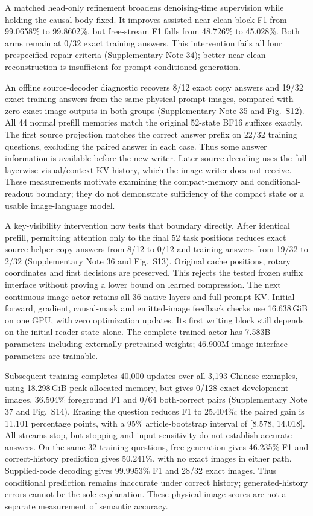A matched head-only refinement broadens denoising-time supervision while
holding the causal body fixed. It improves assisted near-clean block F1 from
99.0658\% to 99.8602\%, but free-stream F1 falls from 48.726\% to 45.028\%.
Both arms remain at 0/32 exact training answers. This intervention fails
all four prespecified repair criteria (Supplementary Note 34); better
near-clean reconstruction is insufficient for prompt-conditioned generation.

An offline source-decoder diagnostic recovers 8/12 exact copy answers and
19/32 exact training answers from the same physical prompt images, compared
with zero exact image outputs in both groups (Supplementary Note 35 and
Fig.~S12). All 44 normal prefill memories match the original 52-state BF16
suffixes exactly. The first source projection matches the correct answer
prefix on 22/32 training questions, excluding the paired answer in each case.
Thus some answer information is available before the new writer. Later
source decoding uses the full layerwise visual/context KV history, which
the image writer does not receive. These measurements motivate examining
the compact-memory and conditional-readout boundary; they do not demonstrate
sufficiency of the compact state or a usable image-language model.

A key-visibility intervention now tests that boundary directly. After identical
prefill, permitting attention only to the final 52 task positions reduces exact
source-helper copy answers from 8/12 to 0/12 and training answers from 19/32 to
2/32 (Supplementary Note 36 and Fig.~S13). Original cache positions, rotary
coordinates and first decisions are preserved. This rejects the tested frozen
suffix interface without proving a lower bound on learned compression. The
next continuous image actor retains all 36 native layers and full prompt KV.
Initial forward, gradient, causal-mask and emitted-image feedback checks use
16.638\,GiB on one GPU, with zero optimization updates. Its first writing block
still depends on the initial reader state alone. The complete trained actor
has 7.583B parameters including externally pretrained weights; 46.900M image
interface parameters are trainable.

Subsequent training completes 40,000 updates over all 3,193 Chinese examples,
using 18.298\,GiB peak allocated memory, but gives 0/128 exact development
images, 36.504\% foreground F1 and 0/64 both-correct pairs (Supplementary
Note 37 and Fig.~S14). Erasing the question reduces F1 to 25.404\%; the paired
gain is 11.101 percentage points, with a 95\% article-bootstrap interval of
[8.578, 14.018]. All streams stop, but stopping and input sensitivity do not
establish accurate answers. On the same 32 training questions, free generation
gives 46.235\% F1 and correct-history prediction gives 50.241\%, with no exact
images in either path. Supplied-code decoding gives 99.9953\% F1 and 28/32
exact images. Thus conditional prediction remains inaccurate under correct
history; generated-history errors cannot be the sole explanation. These
physical-image scores are not a separate measurement of semantic accuracy.

